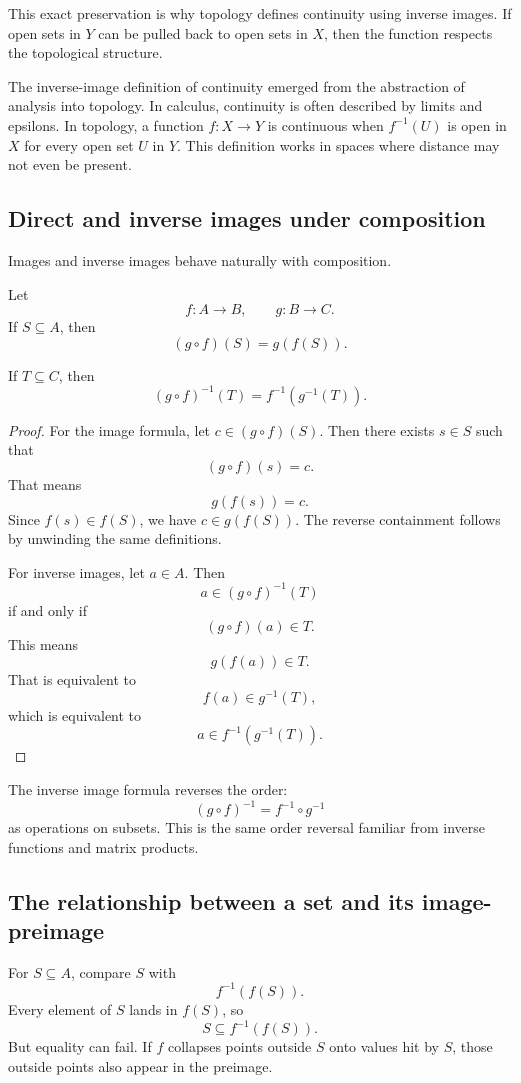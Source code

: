 This exact preservation is why topology defines continuity using inverse images. If open sets in $Y$ can be pulled back to open sets in $X$, then the function respects the topological structure.

\begin{historybox}
The inverse-image definition of continuity emerged from the abstraction of analysis into topology. In calculus, continuity is often described by limits and epsilons. In topology, a function $f:X\to Y$ is continuous when $f^{-1}(U)$ is open in $X$ for every open set $U$ in $Y$. This definition works in spaces where distance may not even be present.
\end{historybox}

\subsection{Direct and inverse images under composition}

Images and inverse images behave naturally with composition.

Let
\[
f:A\to B,\qquad g:B\to C.
\]
If $S\subseteq A$, then
\[
(g\circ f)(S)=g(f(S)).
\]

If $T\subseteq C$, then
\[
(g\circ f)^{-1}(T)=f^{-1}(g^{-1}(T)).
\]

\begin{proof}
For the image formula, let $c\in(g\circ f)(S)$. Then there exists $s\in S$ such that
\[
(g\circ f)(s)=c.
\]
That means
\[
g(f(s))=c.
\]
Since $f(s)\in f(S)$, we have $c\in g(f(S))$. The reverse containment follows by unwinding the same definitions.

For inverse images, let $a\in A$. Then
\[
a\in(g\circ f)^{-1}(T)
\]
if and only if
\[
(g\circ f)(a)\in T.
\]
This means
\[
g(f(a))\in T.
\]
That is equivalent to
\[
f(a)\in g^{-1}(T),
\]
which is equivalent to
\[
a\in f^{-1}(g^{-1}(T)).
\]
\end{proof}

The inverse image formula reverses the order:
\[
(g\circ f)^{-1}=f^{-1}\circ g^{-1}
\]
as operations on subsets. This is the same order reversal familiar from inverse functions and matrix products.

\subsection{The relationship between a set and its image-preimage}

For $S\subseteq A$, compare $S$ with
\[
f^{-1}(f(S)).
\]
Every element of $S$ lands in $f(S)$, so
\[
S\subseteq f^{-1}(f(S)).
\]
But equality can fail. If $f$ collapses points outside $S$ onto values hit by $S$, those outside points also appear in the preimage.

